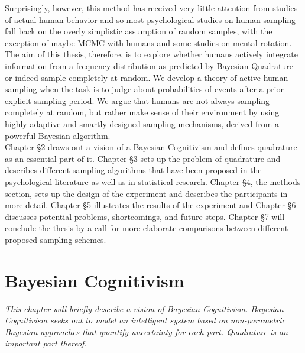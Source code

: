 \documentclass[oneside, 11pt]{book}
\begin{document}
Surprisingly, however, this method has received very little attention from studies of actual human behavior and so most psychological studies on human sampling fall back on the overly simplistic assumption of random samples, with the exception of maybe MCMC with humans and some studies on mental rotation. The aim of this thesis, therefore, is to explore whether humans actively integrate information from a frequency distribution as predicted by Bayesian Quadrature or indeed sample completely at random. We develop a theory of active human sampling when the task is to judge about probabilities of events after a prior explicit sampling period. We argue that humans are not always sampling completely at random, but rather make sense of their environment by using highly adaptive and smartly designed sampling mechanisms, derived from a powerful Bayesian algorithm. \medskip\\

Chapter \S2 draws out a vision of a Bayesian Cognitivism and defines quadrature as an essential part of it. Chapter \S3 sets up the problem of quadrature and describes different sampling algorithms that have been proposed in the psychological literature as well as in statistical research. Chapter \S4, the methods section, sets up the design of the experiment and describes the participants in more detail. Chapter \S5 illustrates the results of the experiment and Chapter \S6 discusses potential problems, shortcomings, and future steps. Chapter \S7 will conclude the thesis by a call for more elaborate comparisons between different proposed sampling schemes.

\chapter{Bayesian Cognitivism}
\emph{This chapter will briefly describe a vision of Bayesian Cognitivism. Bayesian Cognitivism seeks out to model an intelligent system based on non-parametric Bayesian approaches that quantify uncertainty for each part. Quadrature is an important part thereof.}
\end{document}
